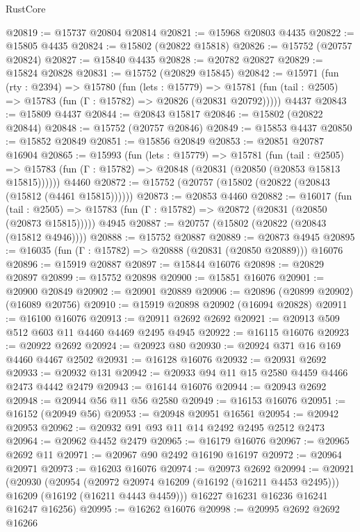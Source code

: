 \begin{lexlean}{RustCore}
\begin{coremodule}
@20819 := @15737 @20804 @20814
@20821 := @15968 @20803 @4435
@20822 := @15805 @4435
@20824 := @15802 (@20822 @15818)
@20826 := @15752 (@20757 @20824)
@20827 := @15840 @4435
@20828 := @20782 @20827
@20829 := @15824 @20828
@20831 := @15752 (@20829 @15845)
@20842 := @15971
    (fun (rty : @2394) =>
    @15780
      (fun (lets : @15779) =>
      @15781 (fun (tail : @2505) => @15783 (fun (Γ : @15782) => @20826 (@20831 @20792)))))
    @4437
@20843 := @15809 @4437
@20844 := @20843 @15817
@20846 := @15802 (@20822 @20844)
@20848 := @15752 (@20757 @20846)
@20849 := @15853 @4437
@20850 := @15852 @20849
@20851 := @15856 @20849
@20853 := @20851 @20787 @16904
@20865 := @15993
    (fun (lets : @15779) =>
    @15781
      (fun (tail : @2505) =>
      @15783 (fun (Γ : @15782) => @20848 (@20831 (@20850 (@20853 @15813 @15815))))))
    @4460
@20872 := @15752 (@20757 (@15802 (@20822 (@20843 (@15812 (@4461 @15815))))))
@20873 := @20853 @4460
@20882 := @16017
    (fun (tail : @2505) => @15783 (fun (Γ : @15782) => @20872 (@20831 (@20850 (@20873 @15815)))))
    @4945
@20887 := @20757 (@15802 (@20822 (@20843 (@15812 @4946))))
@20888 := @15752 @20887
@20889 := @20873 @4945
@20895 := @16035 (fun (Γ : @15782) => @20888 (@20831 (@20850 @20889))) @16076
@20896 := @15919 @20887
@20897 := @15844 @16076
@20898 := @20829 @20897
@20899 := @15752 @20898
@20900 := @15851 @16076
@20901 := @20900 @20849
@20902 := @20901 @20889
@20906 := @20896 (@20899 @20902) (@16089 @20756)
@20910 := @15919 @20898 @20902 (@16094 @20828)
@20911 := @16100 @16076
@20913 := @20911 @2692 @2692
@20921 := @20913 @509 @512 @603 @11 @4460 @4469 @2495 @4945
@20922 := @16115 @16076
@20923 := @20922 @2692
@20924 := @20923 @80
@20930 := @20924 @371 @16 @169 @4460 @4467 @2502
@20931 := @16128 @16076
@20932 := @20931 @2692
@20933 := @20932 @131
@20942 := @20933 @94 @11 @15 @2580 @4459 @4466 @2473 @4442 @2479
@20943 := @16144 @16076
@20944 := @20943 @2692
@20948 := @20944 @56 @11 @56 @2580
@20949 := @16153 @16076
@20951 := @16152 (@20949 @56)
@20953 := @20948 @20951 @16561
@20954 := @20942 @20953
@20962 := @20932 @91 @93 @11 @14 @2492 @2495 @2512 @2473
@20964 := @20962 @4452 @2479
@20965 := @16179 @16076
@20967 := @20965 @2692 @11
@20971 := @20967 @90 @2492 @16190 @16197
@20972 := @20964 @20971
@20973 := @16203 @16076
@20974 := @20973 @2692
@20994 := @20921
    (@20930
      (@20954
        (@20972 @20974 @16209 (@16192 (@16211 @4453 @2495)))
        @16209
        (@16192 (@16211 @4443 @4459)))
      @16227
      @16231
      @16236
      @16241
      @16247
      @16256)
@20995 := @16262 @16076
@20998 := @20995 @2692 @2692 @16266

\end{coremodule}
\end{lexlean}
